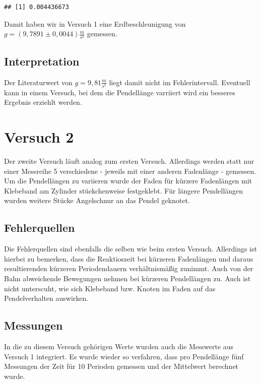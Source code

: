 \documentclass[
  9pt,
]{article}
\begin{document}
\begin{verbatim}
## [1] 0.004436673
\end{verbatim}

Damit haben wir in Versuch 1 eine Erdbeschleunigung von
\(g=(9,7891 \pm 0,0044)\frac{m}{s^2}\) gemessen.

\hypertarget{interpretation}{%
\subsection{Interpretation}\label{interpretation}}

Der Literaturwert von \(g=9,81\frac{m}{s^2}\) liegt damit nicht im
Fehlerintervall. Eventuell kann in einem Versuch, bei dem die
Pendellänge varriiert wird ein besseres Ergebnis erziehlt werden.

\hypertarget{versuch-2}{%
\section{Versuch 2}\label{versuch-2}}

Der zweite Versuch läuft analog zum ersten Versuch. Allerdings werden
statt nur einer Messreihe 5 verschiedene - jeweils mit einer anderen
Fadenlänge - gemessen. Um die Pendellängen zu variieren wurde der Faden
für kürzere Fadenlängen mit Klebeband am Zylinder stückchenweise
festgeklebt. Für längere Pendellängen wurden weitere Stücke Angelschnur
an das Pendel geknotet.

\hypertarget{fehlerquellen-1}{%
\subsection{Fehlerquellen}\label{fehlerquellen-1}}

Die Fehlerquellen sind ebenfalls die selben wie beim ersten Versuch.
Allerdings ist hierbei zu bemerken, dass die Reaktioszeit bei kürzeren
Fadenlängen und daraus resultierenden kürzeren Periodendauern
verhältnismäßig zunimmt. Auch von der Bahn abweichende Bewegungen nehmen
bei kürzeren Pendellängen zu. Auch ist nicht unterscuht, wie sich
Klebeband bzw. Knoten im Faden auf das Pendelverhalten auswirken.

\hypertarget{messungen-1}{%
\subsection{Messungen}\label{messungen-1}}

In die zu diesem Versuch gehörigen Werte wurden auch die Messwerte aus
Versuch 1 integriert. Es wurde wieder so verfahren, dass pro Pendellänge
fünf Messungen der Zeit für 10 Perioden gemessen und der Mittelwert
berechnet wurde.
\end{document}
